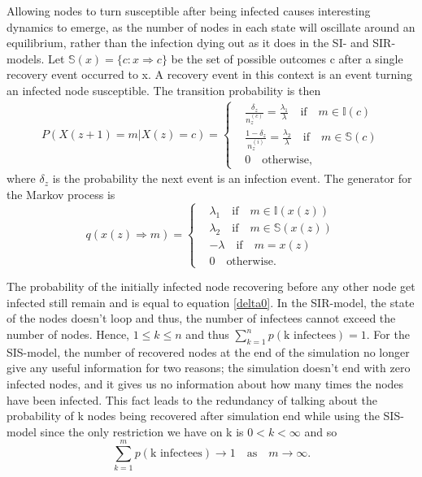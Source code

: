 \documentclass[12pt]{article} %
\numberwithin{equation}{section}
\begin{document}
Allowing nodes to turn susceptible after being infected causes interesting dynamics to emerge, as the number of nodes in each state will oscillate around an equilibrium, rather than the infection dying out as it does in the SI- and SIR-models. Let $\mathbb{S}(x)=\{c: x \Rightarrow c\}$ be the set of possible outcomes c after a single recovery event occurred to x. A recovery event in this context is an event turning an infected node susceptible. The transition probability is then
\begin{equation} \label{firstPSIS}
\begin{split}
P(X(z+1) = m |X(z)= c) =
\begin{cases}
& \frac{\delta_z}{n_z^{(c)}}=\frac{\lambda_1}{\lambda}  \quad \text{if} \quad m \in \mathbb{I}(c) \\
& \frac{1-\delta_z}{n_z^{(i)}}=\frac{\lambda_2}{\lambda}  \quad \text{if} \quad m \in \mathbb{S}(c) \\
& 0 \quad \text{otherwise,}
\end{cases}
\end{split}
\end{equation}
where $\delta_z$ is the probability the next event is an infection event.
The generator for the Markov process is
\begin{equation}\label{qSIS}
    q(x(z)\Rightarrow m) = 
    \begin{cases}
    & \lambda_1 \quad \text{if} \quad m \in \mathbb{I}(x(z)) \\
     & \lambda_2 \quad \text{if} \quad m \in \mathbb{S}(x(z)) \\
    & -\lambda   \quad \text{if} \quad m = x(z)\\
    & 0 \quad \text{otherwise.}
    \end{cases}
\end{equation}

The probability of the initially infected node recovering before any other node get infected still remain and is equal to equation \ref{delta0}. In the SIR-model, the state of the nodes doesn't loop and thus, the number of infectees cannot exceed the number of nodes. Hence, $1 \leq k\leq n$ and thus $\sum^n_{k=1} p(\text{k infectees}) = 1$. For the SIS-model, the number of recovered nodes at the end of the simulation no longer give any useful information for two reasons; the simulation doesn't end with zero infected nodes, and it gives us no information about how many times the nodes have been infected. This fact leads to the redundancy of talking about the probability of k nodes being recovered after simulation end while using the SIS-model since the only restriction we have on k is $0< k < \infty$ and so
\begin{equation}
    \sum^m_{k = 1} p(\text{k infectees}) \rightarrow 1 \quad \text{as} \quad m \rightarrow \infty.
\end{equation}
\end{document}
